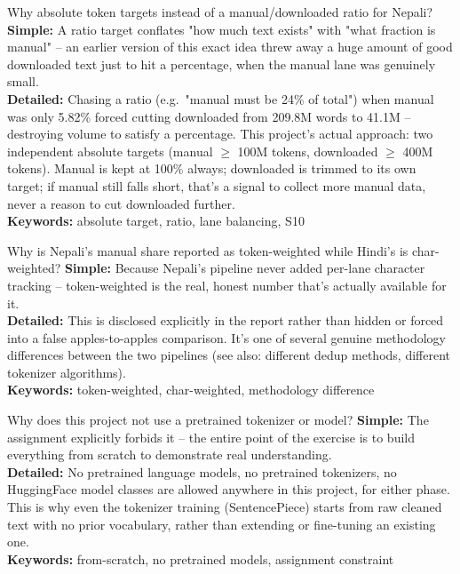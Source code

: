 \documentclass[11pt]{report}
\begin{document}
\begin{qabox}{Why absolute token targets instead of a manual/downloaded
ratio for Nepali?}
\textbf{Simple:} A ratio target conflates "how much text exists" with
"what fraction is manual" -- an earlier version of this exact idea
threw away a huge amount of good downloaded text just to hit a
percentage, when the manual lane was genuinely small.\\
\textbf{Detailed:} Chasing a ratio (e.g.\ "manual must be 24\% of
total") when manual was only 5.82\% forced cutting downloaded from 209.8M
words to 41.1M -- destroying volume to satisfy a percentage. This
project's actual approach: two independent absolute targets (manual
$\geq$ 100M tokens, downloaded $\geq$ 400M tokens). Manual is kept at
100\% always; downloaded is trimmed to its own target; if manual still
falls short, that's a signal to collect more manual data, never a reason
to cut downloaded further.\\
\textbf{Keywords:} absolute target, ratio, lane balancing, S10
\end{qabox}

\begin{qabox}{Why is Nepali's manual share reported as token-weighted
while Hindi's is char-weighted?}
\textbf{Simple:} Because Nepali's pipeline never added per-lane character
tracking -- token-weighted is the real, honest number that's actually
available for it.\\
\textbf{Detailed:} This is disclosed explicitly in the report rather
than hidden or forced into a false apples-to-apples comparison. It's one
of several genuine methodology differences between the two pipelines
(see also: different dedup methods, different tokenizer algorithms).\\
\textbf{Keywords:} token-weighted, char-weighted, methodology difference
\end{qabox}

\begin{qabox}{Why does this project not use a pretrained tokenizer or
model?}
\textbf{Simple:} The assignment explicitly forbids it -- the entire point
of the exercise is to build everything from scratch to demonstrate real
understanding.\\
\textbf{Detailed:} No pretrained language models, no pretrained
tokenizers, no HuggingFace model classes are allowed anywhere in this
project, for either phase. This is why even the tokenizer training
(SentencePiece) starts from raw cleaned text with no prior vocabulary,
rather than extending or fine-tuning an existing one.\\
\textbf{Keywords:} from-scratch, no pretrained models, assignment constraint
\end{qabox}
\end{document}
